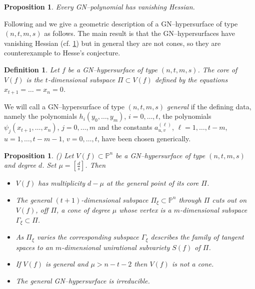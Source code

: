 \documentclass[11pt,a4paper]{amsart}
\newtheorem{prop}[theorem]{Proposition}
\newtheorem{defi}[theorem]{Definition}
\begin{document}
\begin{prop}\label{GNpol}
Every GN--polynomial has vanishing Hessian.
\end{prop}
Following \cite{Permutti2} and \cite{CilibertoRussoSimis} we give
a geometric description of a GN--hypersurface of type $(n,t,m,s)$
as follows. The main result is that the GN--hypersurfaces have
vanishing Hessian (cf. \ref{GNpol}) but in general they are not
cones, so they are counterexample to Hesse's conjecture.

\begin{defi}
{\em Let $f$ be a GN--hypersurface of type $(n,t,m,s)$. The} core {\em of $V(f)$ is the $t$-dimensional subspace $\Pi\subset V(f)$ defined by the equations $x_{t+1}=\ldots =x_n=0$.
}\end{defi}

\medskip
We will call a GN--hypersurface of type $(n,t,m,s)$ {\it general}
if the defining data, namely the polynomials $h_i(y_0, \ldots
,y_m)$, $i=0,\ldots ,t$, the polynomials $\psi_j(x_{t+1}, \ldots
,x_n)$, $j=0,\ldots ,m$ and the constants $a_{u,v}^{(\ell)}$,
$\ell =1,\ldots ,t-m$, $u=1,\ldots ,t-m-1$, $v=0,\ldots ,t$, have
been chosen generically.

\begin{prop}{\rm (\cite[Proposition 2.11]{CilibertoRussoSimis})}
\label{2.11}
Let $V(f)\subset\mathbb{P}^n$  be a GN--hypersurface of type
$(n,t,m,s)$ and degree $d$. Set $\mu =[\frac{d}{s}]$. Then
\begin{itemize}
\item [{\rm i)}] $V(f)$ has multiplicity $d-\mu$ at the general point of its core $\Pi$.
\item [{\rm ii)}] The general $(t+1)$-dimensional subspace $\Pi_\xi\subset\mathbb{P}^n$ through $\Pi$ cuts out on $V(f)$, off $\Pi$, a cone of degree $\mu$ whose vertex is a $m$-dimensional subspace $\Gamma_\xi\subset\Pi$.
\item [{\rm iii)}] As $\Pi_\xi$ varies the corresponding subspace $\Gamma_\xi$ describes the family of tangent spaces to an $m$-dimensional unirational subvariety $S(f)$ of $\Pi$.
\item [{\rm iv)}] If $V(f)$ is general and $\mu > n-t-2$ then $V(f)$ is not a cone.
\item [{\rm v)}] The general GN--hypersurface is irreducible.
\end{itemize}
\end{prop}
\end{document}
